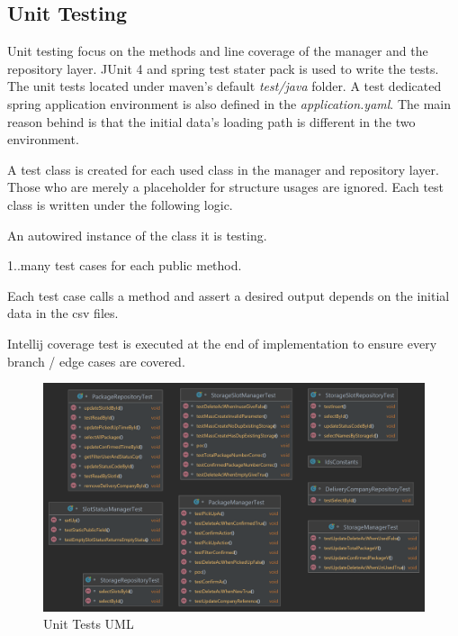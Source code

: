 \subsection{Unit Testing}

Unit testing focus on the methods and line coverage of the manager and the repository layer. JUnit 4 and spring test stater pack is used to write the tests. The unit tests located under maven's default \textit{test/java} folder. A test dedicated spring application environment is also defined in the \textit{application.yaml}. The main reason behind is that the initial data's loading path is different in the two environment.

\bigskip
A test class is created for each used class in the manager and repository layer. Those who are merely a placeholder for structure usages are ignored. Each test class is written under the following logic.

\begin{compactenum}
	\item An autowired instance of the class it is testing.
    \item 1..many test cases for each public method.
    \item Each test case calls a method and assert a desired output depends on the initial data in the csv files.
    \item Intellij coverage test is executed at the end of implementation to ensure every branch / edge cases are covered.
\end{compactenum}

\begin{figure}[H]
    \centering
    \includegraphics[width=0.95\linewidth]{images/test/Unittests.png}
    \caption{Unit Tests UML}
    \label{fig:ut_uml}
\end{figure}

